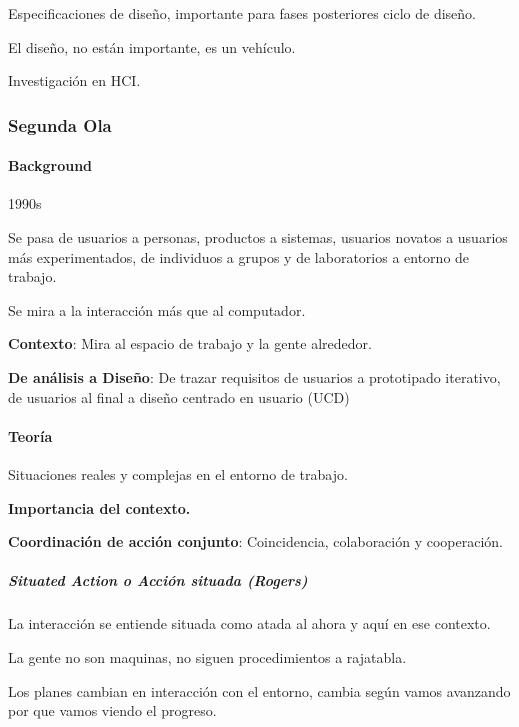 \documentclass[12pt]{report} %
\begin{document}
Especificaciones de diseño, importante para fases posteriores ciclo de
diseño.

El diseño, no están importante, es un vehículo.

Investigación en HCI.

\hypertarget{segunda-ola}{%
\subsubsection{Segunda Ola}\label{segunda-ola}}

\hypertarget{background-1}{%
\paragraph{Background}\label{background-1}}

1990s

Se pasa de usuarios a personas, productos a sistemas, usuarios novatos a
usuarios más experimentados, de individuos a grupos y de laboratorios a
entorno de trabajo.

Se mira a la interacción más que al computador.

\textbf{Contexto}: Mira al espacio de trabajo y la gente alrededor.

\textbf{De análisis a Diseño}: De trazar requisitos de usuarios a
prototipado iterativo, de usuarios al final a diseño centrado en usuario
(UCD)

\hypertarget{teoruxeda-1}{%
\paragraph{Teoría}\label{teoruxeda-1}}

Situaciones reales y complejas en el entorno de trabajo.

\textbf{Importancia del contexto.}

\textbf{Coordinación de acción conjunto}: Coincidencia, colaboración y
cooperación.

\hypertarget{situated-action-o-acciuxf3n-situada-rogers}{%
\subparagraph{Situated Action o Acción situada
(Rogers)}\label{situated-action-o-acciuxf3n-situada-rogers}}

La interacción se entiende situada como atada al ahora y aquí en ese
contexto.

La gente no son maquinas, no siguen procedimientos a rajatabla.

Los planes cambian en interacción con el entorno, cambia según vamos
avanzando por que vamos viendo el progreso.
\end{document}
